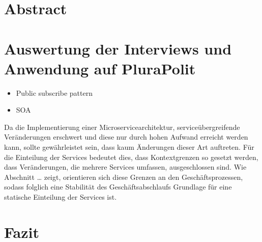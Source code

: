 \documentclass[a4paper, 12pt, headsepline]{scrartcl}
\begin{document}


\newpage
{}

\section*{Abstract}

\newpage

\tableofcontents

\newpage
{}
\setcounter{page}{1}


\newpage





\section{Auswertung der Interviews und Anwendung auf PluraPolit}
\begin{itemize}
	\item Public subscribe pattern
	\item SOA 
\end{itemize}

Da die Implementierung einer Microservicearchitektur, serviceübergreifende Veränderungen erschwert und diese nur durch hohen Aufwand erreicht werden kann, sollte gewährleistet sein, dass kaum Änderungen dieser Art auftreten. Für die Einteilung der Services bedeutet dies, dass Kontextgrenzen so gesetzt werden, dass Veränderungen, die mehrere Services umfassen, ausgeschlossen sind. Wie Abschnitt … zeigt, orientieren sich diese Grenzen an den Geschäftsprozessen, sodass folglich eine Stabilität des Geschäftsabschlaufs Grundlage für eine statische Einteilung der Services ist.

\section{Fazit}

\newpage

\printbibliography[title=Literaturverzeichnis]

\newpage

\listoffigures

\newpage


\end{document}
